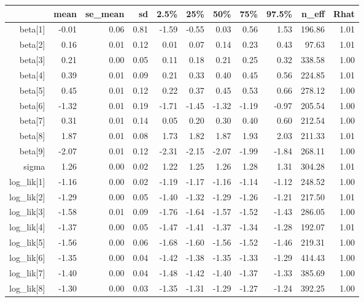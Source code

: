 \begin{table}[ht]
\centering
\begin{tabular}{rrrrrrrrrrr}
  \hline
 & mean & se\_mean & sd & 2.5\% & 25\% & 50\% & 75\% & 97.5\% & n\_eff & Rhat \\ 
  \hline
beta[1] & -0.01 & 0.06 & 0.81 & -1.59 & -0.55 & 0.03 & 0.56 & 1.53 & 196.86 & 1.01 \\ 
  beta[2] & 0.16 & 0.01 & 0.12 & 0.01 & 0.07 & 0.14 & 0.23 & 0.43 & 97.63 & 1.01 \\ 
  beta[3] & 0.21 & 0.00 & 0.05 & 0.11 & 0.18 & 0.21 & 0.25 & 0.32 & 338.58 & 1.00 \\ 
  beta[4] & 0.39 & 0.01 & 0.09 & 0.21 & 0.33 & 0.40 & 0.45 & 0.56 & 224.85 & 1.01 \\ 
  beta[5] & 0.45 & 0.01 & 0.12 & 0.22 & 0.37 & 0.45 & 0.53 & 0.66 & 278.12 & 1.00 \\ 
  beta[6] & -1.32 & 0.01 & 0.19 & -1.71 & -1.45 & -1.32 & -1.19 & -0.97 & 205.54 & 1.00 \\ 
  beta[7] & 0.31 & 0.01 & 0.14 & 0.05 & 0.20 & 0.30 & 0.40 & 0.60 & 212.54 & 1.00 \\ 
  beta[8] & 1.87 & 0.01 & 0.08 & 1.73 & 1.82 & 1.87 & 1.93 & 2.03 & 211.33 & 1.01 \\ 
  beta[9] & -2.07 & 0.01 & 0.12 & -2.31 & -2.15 & -2.07 & -1.99 & -1.84 & 268.11 & 1.00 \\ 
  sigma & 1.26 & 0.00 & 0.02 & 1.22 & 1.25 & 1.26 & 1.28 & 1.31 & 304.28 & 1.01 \\ 
  log\_lik[1] & -1.16 & 0.00 & 0.02 & -1.19 & -1.17 & -1.16 & -1.14 & -1.12 & 248.52 & 1.00 \\ 
  log\_lik[2] & -1.29 & 0.00 & 0.05 & -1.40 & -1.32 & -1.29 & -1.26 & -1.21 & 217.50 & 1.01 \\ 
  log\_lik[3] & -1.58 & 0.01 & 0.09 & -1.76 & -1.64 & -1.57 & -1.52 & -1.43 & 286.05 & 1.00 \\ 
  log\_lik[4] & -1.37 & 0.00 & 0.05 & -1.47 & -1.41 & -1.37 & -1.34 & -1.28 & 192.07 & 1.01 \\ 
  log\_lik[5] & -1.56 & 0.00 & 0.06 & -1.68 & -1.60 & -1.56 & -1.52 & -1.46 & 219.31 & 1.00 \\ 
  log\_lik[6] & -1.35 & 0.00 & 0.04 & -1.42 & -1.38 & -1.35 & -1.33 & -1.29 & 414.43 & 1.00 \\ 
  log\_lik[7] & -1.40 & 0.00 & 0.04 & -1.48 & -1.42 & -1.40 & -1.37 & -1.33 & 385.69 & 1.00 \\ 
  log\_lik[8] & -1.30 & 0.00 & 0.03 & -1.35 & -1.31 & -1.29 & -1.27 & -1.24 & 392.25 & 1.00 \\ 

\end{tabular}
\end{table}
